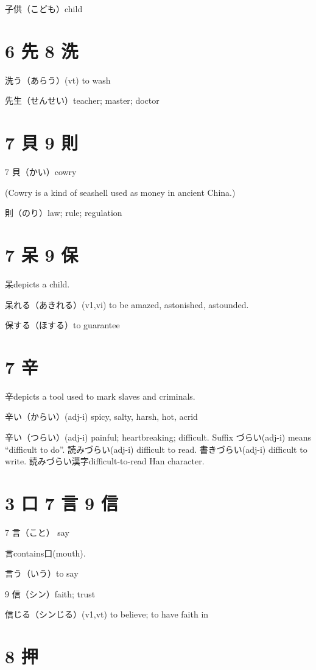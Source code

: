 子供（こども）child

\section{6 先 8 洗}

洗う（あらう）(vt) to wash

先生（せんせい）teacher; master; doctor

\section{7 貝 9 則}

7 貝（かい）cowry

(Cowry is a kind of seashell used as money in ancient China.)

則（のり）law; rule; regulation

\section{7 呆 9 保}

呆depicts a child.

呆れる（あきれる）(v1,vi) to be amazed, astonished, astounded.

保する（ほする）to guarantee

\section{7 辛}

辛depicts a tool used to mark slaves and criminals.

辛い（からい）(adj-i) spicy, salty, harsh, hot, acrid

辛い（つらい）(adj-i) painful; heartbreaking; difficult.
Suffix づらい(adj-i) means ``difficult to do''.
読みづらい(adj-i) difficult to read.
書きづらい(adj-i) difficult to write.
読みづらい漢字difficult-to-read Han character.

\section{3 口 7 言 9 信}

7 言（こと） say

言contains口(mouth).

言う（いう）to say

9 信（シン）faith; trust

信じる（シンじる）(v1,vt) to believe; to have faith in

\section{8 押}

